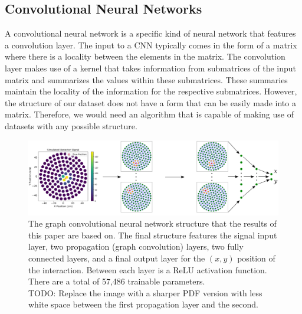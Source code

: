 \documentclass[thesis.tex]{subfiles}
\begin{document}
\subsection{Convolutional Neural Networks}
A convolutional neural network is a specific kind of neural network that features a convolution layer.
The input to a CNN typically comes in the form of a matrix where there is a locality between the elements in the matrix.
The convolution layer makes use of a kernel that takes information from submatrices of the input matrix and summarizes the values within these submatrices.
These summaries maintain the locality of the information for the respective submatrices.
However, the structure of our dataset does not have a form that can be easily made into a matrix.
Therefore, we would need an algorithm that is capable of making use of datasets with any possible structure.
\begin{figure}[t]
	\centering
	\includegraphics[width=\linewidth]{figures/GCNN_Structure.png}
	\caption{
	The graph convolutional neural network structure that the results of this paper are based on.
	The final structure features the signal input layer, two propagation (graph convolution) layers, two fully connected layers, and a final output layer for the $(x,y)$ position of the interaction.
	Between each layer is a ReLU activation function.
	There are a total of 57,486 trainable parameters.
	\\ TODO: Replace the image with a sharper PDF version with less white space between the first propagation layer and the second.
	}
	\label{fig:figures/GCNN_Structure}
\end{figure}
\end{document}
